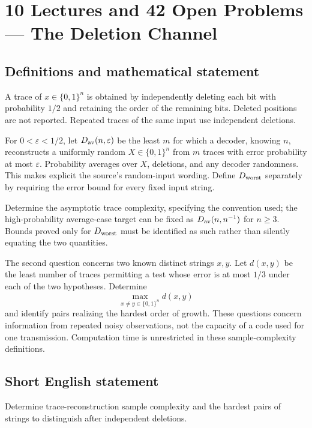 \documentclass[11pt,a4paper]{article}
\begin{document}
\section*{10 Lectures and 42 Open Problems — The Deletion Channel}\label{statement}

\subsection{Definitions and mathematical statement}
A trace of $x\in\{0,1\}^n$ is obtained by independently deleting each
bit with probability $1/2$ and retaining the order of the remaining
bits. Deleted positions are not reported. Repeated traces of the
same input use independent deletions.

For $0<\varepsilon<1/2$, let $D_{\rm av}(n,\varepsilon)$ be the
least $m$ for which a decoder, knowing $n$, reconstructs a uniformly
random $X\in\{0,1\}^n$ from $m$ traces with error probability at most
$\varepsilon$. Probability averages over $X$, deletions, and any
decoder randomness. This makes explicit the source's random-input
wording. Define $D_{\rm worst}$ separately by requiring the error bound
for every fixed input string.

Determine the asymptotic trace complexity, specifying the convention
used; the high-probability average-case target can be fixed as
$D_{\rm av}(n,n^{-1})$ for $n\ge3$. Bounds proved only for
$D_{\rm worst}$ must be identified as such rather than silently
equating the two quantities.

The second question concerns two known distinct strings $x,y$.
Let $d(x,y)$ be the least number of traces permitting a test whose
error is at most $1/3$ under each of the two hypotheses. Determine
\[
                  \max_{x\ne y\in\{0,1\}^n}d(x,y)
\]
and identify pairs realizing the hardest order of growth. These
questions concern information from repeated noisy observations, not
the capacity of a code used for one transmission. Computation time is
unrestricted in these sample-complexity definitions.
\subsection{Short English statement}
Determine trace-reconstruction sample complexity and the hardest pairs of strings to distinguish after independent deletions.
\end{document}
